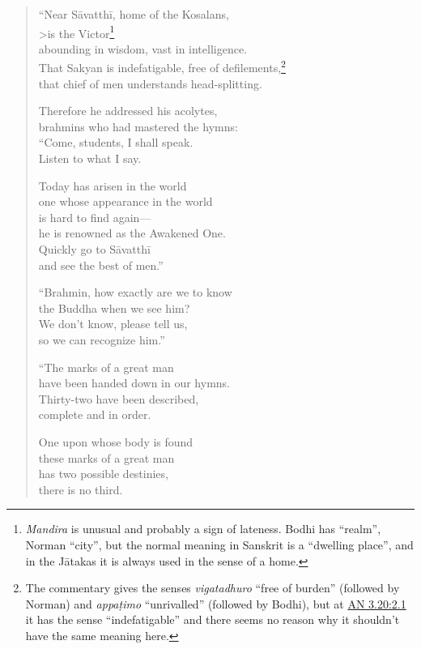 \documentclass[12pt,openany]{book}%
\begin{document}
\begin{verse}
“Near \textsanskrit{Sāvatthī}, home of the Kosalans, \\>is the Victor\footnote{\textit{Mandira} is unusual and probably a sign of lateness. Bodhi has “realm”, Norman “city”, but the normal meaning in Sanskrit is a “dwelling place”, and in the \textsanskrit{Jātakas} it is always used in the sense of a home. } \\
abounding in wisdom, vast in intelligence. \\
That Sakyan is indefatigable, free of defilements,\footnote{The commentary gives the senses \textit{vigatadhuro} “free of burden” (followed by Norman) and \textit{\textsanskrit{appaṭimo}} “unrivalled” (followed by Bodhi), but at \href{https://suttacentral.net/an3.20/en/sujato\#2.1}{AN 3.20:2.1} it has the sense “indefatigable” and there seems no reason why it shouldn’t have the same meaning here. } \\
that chief of men understands head-splitting. 

Therefore he addressed his acolytes, \\
brahmins who had mastered the hymns: \\
“Come, students, I shall speak. \\
Listen to what I say. 

Today has arisen in the world \\
one whose appearance in the world \\
is hard to find again—\\
he is renowned as the Awakened One. \\
Quickly go to \textsanskrit{Sāvatthī} \\
and see the best of men.” 

“Brahmin, how exactly are we to know \\
the Buddha when we see him? \\
We don’t know, please tell us, \\
so we can recognize him.” 

“The marks of a great man \\
have been handed down in our hymns. \\
Thirty-two have been described, \\
complete and in order. 

One upon whose body is found \\
these marks of a great man \\
has two possible destinies, \\
there is no third. 


\end{verse}
\end{document}
